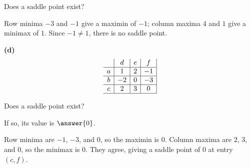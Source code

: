 \documentclass[12pt]{ximera}
\begin{document}
\begin{problem}
\begin{prompt}
Does a saddle point exist?
\begin{multipleChoice}
\end{multipleChoice}

\begin{feedback}
Row minima $-3$ and $-1$ give a maximin of $-1$; column maxima $4$ and $1$ give a
minimax of $1$. Since $-1\neq 1$, there is no saddle point.
\end{feedback}
\end{prompt}

\begin{prompt}
\textbf{(d)}
\[
\begin{array}{c|c|c|c|}
\phantom{|} & d & e & f \\\hline
a & 1 & 2 & -1 \\\hline
b & -2 & 0 & -3 \\\hline
c & 2 & 3 & 0 \\\hline
\end{array}
\]

Does a saddle point exist?
\begin{multipleChoice}
\end{multipleChoice}

If so, its value is $\answer{0}$.

\begin{feedback}
Row minima are $-1$, $-3$, and $0$, so the maximin is $0$. Column maxima are $2$, $3$,
and $0$, so the minimax is $0$. They agree, giving a saddle point of $0$ at entry
$(c,f)$.
\end{feedback}
\end{prompt}
\end{problem}
\end{document}

